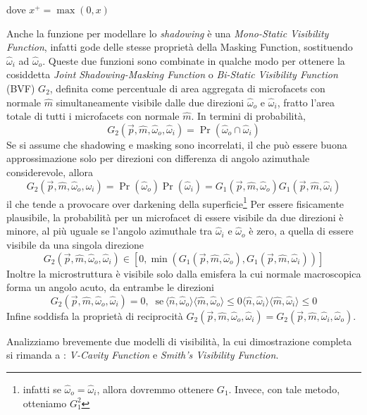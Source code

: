 dove $x^+=\max(0,x)$\par
Anche la funzione per modellare lo \textit{shadowing} \`e una \textit{Mono-Static Visibility Function}, infatti gode delle stesse propriet\`a della 
Masking Function, sostituendo $\hat{\omega}_i$ ad $\hat{\omega}_o$. Queste due funzioni sono combinate in qualche modo per ottenere la cosiddetta
\textit{Joint Shadowing-Masking Function} o \textit{Bi-Static Visibility Function} (BVF) $G_2$, definita come percentuale di area aggregata di 
microfacets con normale $\hat{m}$ simultaneamente visibile dalle due direzioni $\hat{\omega}_o$ e $\hat{\omega}_i$, fratto l'area totale di tutti i 
microfacets con normale $\hat{m}$. In termini di probabilit\`a,
\begin{equation}
	G_2(\vec{p},\hat{m},\hat{\omega}_o,\hat{\omega}_i) = \Pr(\hat{\omega}_o\cap\hat{\omega}_i)
\end{equation}
Se si assume che shadowing e masking sono incorrelati, il che pu\`o essere buona approssimazione solo per direzioni con differenza di angolo azimuthale
considerevole, allora
\begin{equation}
	G_2(\vec{p},\hat{m},\hat{\omega}_o,\hat{\omega}_i)=\Pr(\hat{\omega}_o)\Pr(\hat{\omega}_i)=%
		G_1(\vec{p},\hat{m},\hat{\omega}_o)G_1(\vec{p},\hat{m},\hat{\omega}_i)
\end{equation}
il che tende a provocare over darkening della superficie\footnote{infatti se $\hat{\omega}_o=\hat{\omega}_i$, allora dovremmo ottenere $G_1$. Invece,
con tale metodo, otteniamo $G_1^2$}
Per essere fisicamente plausibile, la probabilit\`a per un microfacet di essere visibile da due direzioni \`e minore, al pi\`u uguale se l'angolo 
azimuthale tra $\hat{\omega}_i$ e $\hat{\omega}_o$ \`e zero, a quella di essere visibile da una singola direzione
\begin{equation}
	G_2(\vec{p},\hat{m},\hat{\omega}_o,\hat{\omega}_i)\in[0, \min(G_1(\vec{p},\hat{m},\hat{\omega}_o),G_1(\vec{p},\hat{m},\hat{\omega}_i))]
\end{equation}
Inoltre la microstruttura \`e visibile solo dalla emisfera la cui normale macroscopica forma un angolo acuto, da entrambe le direzioni
\begin{equation}
	G_2(\vec{p},\hat{m},\hat{\omega}_o,\hat{\omega}_i) = 0,\;\;\mathrm{se}\,%
		\langle\hat{n},\hat{\omega}_o\rangle\langle\hat{m},\hat{\omega}_o\rangle\leq0%
		\langle\hat{n},\hat{\omega}_i\rangle\langle\hat{m},\hat{\omega}_i\rangle\leq0
\end{equation}
Infine soddisfa la propriet\`a di reciprocit\`a $G_2(\vec{p},\hat{m},\hat{\omega}_o,\hat{\omega}_i)=G_2(\vec{p},\hat{m},\hat{\omega}_i,\hat{\omega}_o)$.
\par
Analizziamo brevemente due modelli di visibilit\`a, la cui dimostrazione completa si rimanda a \cite{pegoraro}: \textit{V-Cavity Function} e
\textit{Smith's Visibility Function}.
